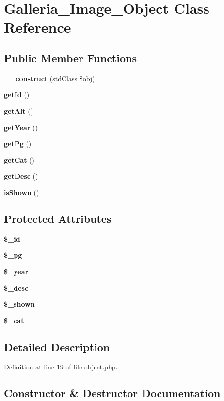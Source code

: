 \section{Galleria\_\-Image\_\-Object Class Reference}
\label{classGalleria__Image__Object}
\subsection*{Public Member Functions}
\begin{CompactItemize}
\item 
{\bf \_\-\_\-construct} (stdClass \$obj)
\item 
{\bf getId} ()
\item 
{\bf getAlt} ()
\item 
{\bf getYear} ()
\item 
{\bf getPg} ()
\item 
{\bf getCat} ()
\item 
{\bf getDesc} ()
\item 
{\bf isShown} ()
\end{CompactItemize}
\subsection*{Protected Attributes}
\begin{CompactItemize}
\item 
{\bf \$\_\-id}
\item 
{\bf \$\_\-pg}
\item 
{\bf \$\_\-year}
\item 
{\bf \$\_\-desc}
\item 
{\bf \$\_\-shown}
\item 
{\bf \$\_\-cat}
\end{CompactItemize}


\subsection{Detailed Description}


Definition at line 19 of file object.php.

\subsection{Constructor \& Destructor Documentation}
